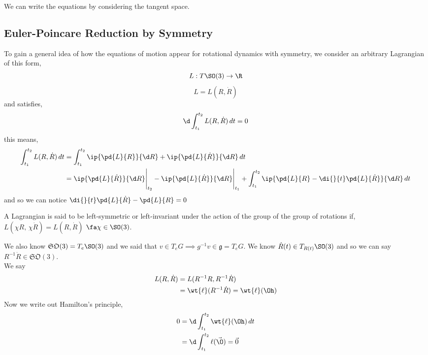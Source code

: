 \noindent
We can write the equations by considering the tangent space.


\subsection{Euler-Poincare Reduction by Symmetry}
To gain a general idea of how the equations of motion appear for rotational dynamics with symmetry, we consider an arbitrary Lagrangian of this form,
$$ L : T\SO(3) \to \R $$
$$ L = L(R, \dot R) $$
and satisfies,
$$ \d\int_{t_1}^{t_2} L(R, \dot R)\,dt = 0 $$
this means,
\begin{align*}
  \int_{t_1}^{t_2} L(R, \dot R)\,dt &= \int_{t_1}^{t_2} \ip{\pd{L}{R}}{\d R} + \ip{\pd{L}{\dot R}}{\d R}\, dt\\
  &= \ip{\pd{L}{\dot R}}{\d R}\Bigg|_{t_2} - \ip{\pd{L}{\dot R}}{\d R}\Bigg|_{t_1} + \int_{t_1}^{t_2} \ip{\pd{L}{R} - \di{}{t} \pd{L}{\dot R}}{\d R} \,dt
\end{align*}
and so we can notice $\di{}{t}\pd{L}{\dot R} - \pd{L}{R} = 0$
\begin{ndefi}
  A Lagrangian is said to be left-symmetric or left-invariant under the action of the group of the group of rotations if, $L(\chi R,\, \chi\dot R) = L(R, \dot R)$ $\fa \chi \in \SO(3)$.
\end{ndefi}
We also know $\mathfrak{SO}(3) = T_e\SO(3)$ and we said that $v \in T_eG \implies g^{-1}v \in \mathfrak{g} = T_eG$. We know $\dot R(t) \in T_{R(t)}\SO(3)$ and so we can say $R^{-1}\dot R \in \mathfrak{SO}(3)$.\\

We say
\begin{align*}
  L(R, \dot R) &= L(R^{-1}R, R^{-1}\dot R)\\
  &= \wt{\ell}(R^{-1}\dot R) = \wt{\ell}(\Oh)
\end{align*}
Now we write out Hamilton's principle,
\begin{align*}
  0 &= \d \int_{t_1}^{t_2} \wt{\ell}(\Oh)\,dt\\
  &= \d \int_{t_1}^{t_2} \ell(\vec\O) = \vec{0}\\
\end{align*}
